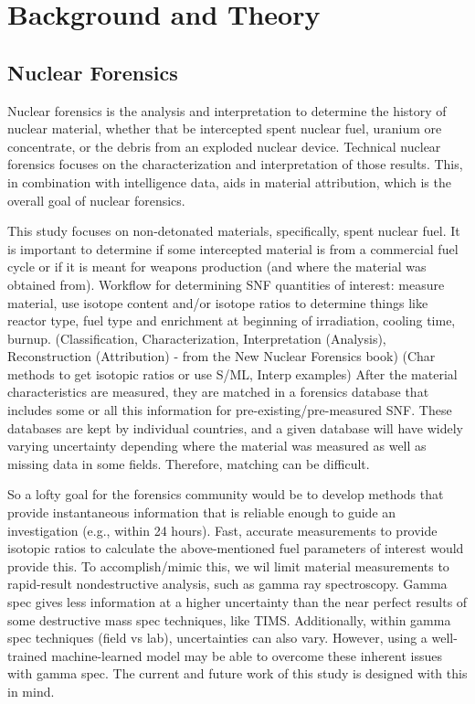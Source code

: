 \documentclass{anstrans}
\begin{document}
\section{Background and Theory}

\subsection{Nuclear Forensics}

Nuclear forensics is the analysis and interpretation to determine the history
of nuclear material, whether that be intercepted spent nuclear fuel, uranium
ore concentrate, or the debris from an exploded nuclear device. Technical
nuclear forensics focuses on the characterization and interpretation of those
results. This, in combination with intelligence data, aids in material
attribution, which is the overall goal of nuclear forensics.  

This study focuses on non-detonated materials, specifically, spent nuclear
fuel. It is important to determine if some intercepted material is from a
commercial fuel cycle or if it is meant for weapons production (and where the
material was obtained from).  Workflow for determining SNF quantities of
interest: measure material, use isotope content and/or isotope ratios to
determine things like reactor type, fuel type and enrichment at beginning of
irradiation, cooling time, burnup.  (Classification, Characterization,
Interpretation (Analysis), Reconstruction (Attribution) - from the New Nuclear
Forensics book) (Char methods to get isotopic ratios or use S/ML, Interp
examples) After the material characteristics are measured, they are matched in
a forensics database that includes some or all this information for
pre-existing/pre-measured SNF. These databases are kept by individual
countries, and a given database will have widely varying uncertainty depending
where the material was measured as well as missing data in some fields.
Therefore, matching can be difficult.

So a lofty goal for the forensics community would be to develop methods that
provide instantaneous information that is reliable enough to guide an
investigation (e.g., within 24 hours). Fast, accurate measurements to provide
isotopic ratios to calculate the above-mentioned fuel parameters of interest
would provide this. To accomplish/mimic this, we wil limit material
measurements to rapid-result nondestructive analysis, such as gamma ray
spectroscopy. Gamma spec gives less information at a higher uncertainty than
the near perfect results of some destructive mass spec techniques, like TIMS.
Additionally, within gamma spec techniques (field vs lab), uncertainties can
also vary. However, using a well-trained machine-learned model may be able to
overcome these inherent issues with gamma spec. The current and future work of
this study is designed with this in mind. 
\end{document}

